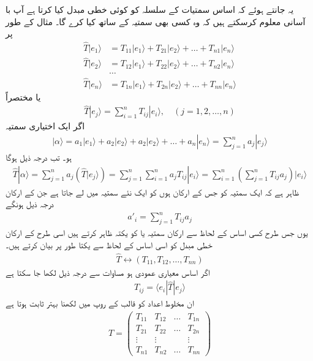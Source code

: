 یہ جانتے ہوئے کہ اساس سمتیات کے سلسلہ کو کوئی خطی مبدل کیا کرتا ہے آپ با آسانی معلوم کرسکتے ہیں کہ وہ کسی بھی سمتیہ کے ساتھ کیا کرے گا۔ مثال کے طور پر 
\begin{align*}
	\hat{T}|e_1\rangle &= T_{11}|e_1\rangle+T_{21}|e_2\rangle+\dots+T_{n1}|e_n\rangle\\
	\hat{T}|e_2\rangle &= T_{12}|e_1\rangle+T_{22}|e_2\rangle+\dots+T_{n2}|e_n\rangle\\
	&\dots\\
	\hat{T}|e_n\rangle &= T_{1n}|e_1\rangle+T_{2n}|e_2\rangle+\dots+T_{nn}|e_n\rangle
\end{align*}
یا مختصراً
\begin{align}
	\hat{T}|e_{j}\rangle=\sum_{i=1}^{n}T_{ij}|e_i\rangle,\quad(j=1, 2, \dots, n)
\end{align}
اگر  ایک اختیاری سمتیہ 
\begin{align}
	|\alpha\rangle=a_1|e_1\rangle+a_2|e_2\rangle+a_2|e_2\rangle+\dots+a_n|e_n\rangle=\sum_{j=1}^{n}a_j|e_j\rangle
\end{align}
ہو۔ تب درجہ ذیل ہوگا
\begin{align}
	\hat{T}|\alpha\rangle=\sum_{j=1}^{n}a_j\left(\hat{T}|e_j\rangle\right)=\sum_{j=1}^{n}\sum_{i=1}^{n}a_jT_{ij}|e_i\rangle=\sum_{i=1}^{n}\left(\sum_{j=1}^{n}T_{ij}a_j\right)|e_i\rangle
\end{align}
ظاہر ہے کہ  ایک سمتیہ کو جس کے ارکان  ہوں کو ایک نئے سمتیہ میں لے جاتا ہے جن کے ارکان درجہ ذیل ہونگے
\begin{align}
	a'_i=\sum_{j=1}^{n}T_{ij}a_j
\end{align}
یوں جس طرح کسی اساس کے لحاظ سے  ارکان  سمتیہ یا  کو یکتہ ظاہر کرتے ہیں اسی طرح  کے  ارکان خطی مبدل  کو اسی اساس کے لحاظ سے یکتا طور پر بیان کرتے ہیں۔
\begin{align}
	\hat{T}\leftrightarrow(T_{11}, T_{12}, \dots, T_{nn})
\end{align}
اگر اساس معیاری عمودی ہو  مساوات  سے درجہ ذیل لکھا جا سکتا ہے
\begin{align}
	T_{ij}=\langle e_i|\hat{T}|e_j\rangle
\end{align}
ان مخلوط اعداد کو قالب کے روپ میں لکھنا بہتر ثابت ہوتا ہے 
\begin{align}
	T=
	\begin{pmatrix}
		T_{11} & T_{12} & \dots & T_{1n}\\
		T_{21} & T_{22} & \dots & T_{2n}\\
		\vdots & \vdots & & \vdots\\
		T_{n1} & T_{n2} & \dots & T_{nn}
	\end{pmatrix}
\end{align}
